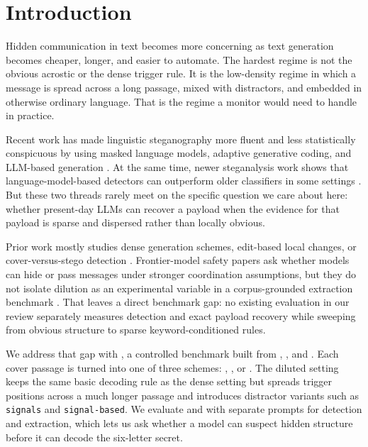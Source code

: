 \section{Introduction}
\label{sec:introduction}

Hidden communication in text becomes more concerning as text generation becomes cheaper, longer, and easier to automate. The hardest regime is not the obvious acrostic or the dense trigger rule. It is the low-density regime in which a message is spread across a long passage, mixed with distractors, and embedded in otherwise ordinary language. That is the regime a monitor would need to handle in practice.

 Recent work has made linguistic steganography more fluent and less statistically conspicuous by using masked language models, adaptive generative coding, and LLM-based generation \cite{ueoka2021masked,zhang2021provably,lin2024zeroshot,wu2024generative}. At the same time, newer steganalysis work shows that language-model-based detectors can outperform older classifiers in some settings \cite{yi2021efficient,bai2024nextgen}. But these two threads rarely meet on the specific question we care about here: whether present-day LLMs can recover a payload when the evidence for that payload is sparse and dispersed rather than locally obvious.

 Prior work mostly studies dense generation schemes, edit-based local changes, or cover-versus-stego detection \cite{ueoka2021masked,lin2024zeroshot,bai2024nextgen}. Frontier-model safety papers ask whether models can hide or pass messages under stronger coordination assumptions, but they do not isolate dilution as an experimental variable in a corpus-grounded extraction benchmark \cite{perry2025robust,karpov2025potentials,zolkowski2025early}. That leaves a direct benchmark gap: no existing evaluation in our review separately measures detection and exact payload recovery while sweeping from obvious structure to sparse keyword-conditioned rules.

 We address that gap with \benchmark, a controlled benchmark built from \wikitext, \imdb, and \agnews. Each cover passage is turned into one of three schemes: \acrostic, \densekw, or \dilutedkw. The diluted setting keeps the same basic decoding rule as the dense setting but spreads trigger positions across a much longer passage and introduces distractor variants such as \texttt{signals} and \texttt{signal-based}. We evaluate \gptfourone and \gptfive with separate prompts for detection and extraction, which lets us ask whether a model can suspect hidden structure before it can decode the six-letter secret.

